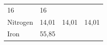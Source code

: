 {\begin{tabular}[t]{|l|l|l|l|}
    
        16 &
    
    
        16%
     \tabularnewline\cline{1-1}\cline{2-2}\cline{3-3}\cline{4-4}
    
    
        Nitrogen &
    
    
        14,01 &
    
    
        14,01 &
    
    
        14,01%
     \tabularnewline\cline{1-1}\cline{2-2}\cline{3-3}\cline{4-4}
    
    
        Iron &
    
    
        55,85 &
    

\end{tabular}}
